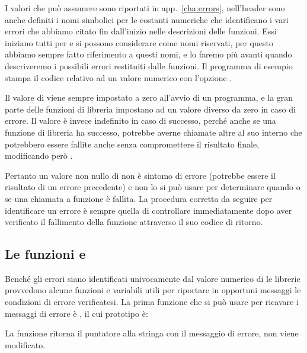 I valori che può assumere  sono riportati in app.~\ref{cha:errors},
nell'header  sono anche definiti i nomi simbolici per le
costanti numeriche che identificano i vari errori che abbiamo citato fin
dall'inizio nelle descrizioni delle funzioni.  Essi iniziano tutti per 
e si possono considerare come nomi riservati, per questo abbiamo sempre fatto
riferimento a questi nomi, e lo faremo più avanti quando descriveremo i
possibili errori restituiti dalle funzioni. Il programma di esempio
 stampa il codice relativo ad un valore numerico con l'opzione
.

Il valore di  viene sempre impostato a zero all'avvio di un
programma, e la gran parte delle funzioni di libreria impostano  ad
un valore diverso da zero in caso di errore. Il valore è invece indefinito in
caso di successo, perché anche se una funzione di libreria ha successo,
potrebbe averne chiamate altre al suo interno che potrebbero essere fallite
anche senza compromettere il risultato finale, modificando però .

Pertanto un valore non nullo di  non è sintomo di errore (potrebbe
essere il risultato di un errore precedente) e non lo si può usare per
determinare quando o se una chiamata a funzione è fallita.  La procedura
corretta da seguire per identificare un errore è sempre quella di controllare
 immediatamente dopo aver verificato il fallimento della funzione
attraverso il suo codice di ritorno.


\subsection{Le funzioni  e }
\label{sec:sys_strerror}

Benché gli errori siano identificati univocamente dal valore numerico di
 le librerie provvedono alcune funzioni e variabili utili per
riportare in opportuni messaggi le condizioni di errore verificatesi.  La
prima funzione che si può usare per ricavare i messaggi di errore è
, il cui prototipo è:

\begin{funcproto}{
}

{La funzione ritorna il puntatore alla stringa con il messaggio di errore,
   non viene modificato.}
\end{funcproto}

